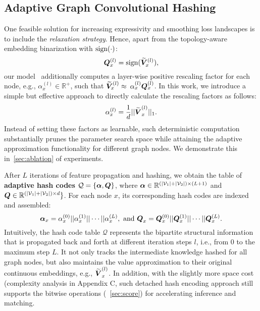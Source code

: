 \subsection{Adaptive Graph Convolutional Hashing}
\label{sec:hashing}
One feasible solution for increasing expressivity and smoothing loss landscapes is to include the \textit{relaxation strategy}.
Hence, apart from the topology-aware embedding binarization with $\operatorname{sign}(\cdot)$:
\begin{equation}
\setlength\abovedisplayskip{2pt}
\setlength\belowdisplayskip{2pt}
\label{eq:hashing}
\emb{Q}_{x}^{(l)} = \sign(\widetilde{\emb{V}}_{x}^{(l)}),
\end{equation}
our model \model~additionally computes a layer-wise positive rescaling factor for each node, e.g., $\alpha_x^{(l)} \in \mathbb{R}^+$, such that $\widetilde{\boldsymbol{V}}^{(l)}_x \approx$ $\alpha_x^{(l)} \boldsymbol{Q}^{(l)}_x$.
In this work, we introduce a simple but effective approach to directly calculate the rescaling factors as follows: 
\begin{equation}
\setlength\abovedisplayskip{2pt}
\setlength\belowdisplayskip{2pt}
\label{eq:rescale}
\alpha_x^{(l)} = \frac{1}{d} ||\widetilde{\emb{{V}}}_x^{(l)}||_1.
\end{equation}
Instead of setting these factors as learnable, such deterministic computation substantially prunes the parameter search space while attaining the adaptive approximation functionality for different graph nodes. 
We demonstrate this in~\cref{sec:ablation} of experiments. 



After $L$ iterations of feature propagation and hashing, we obtain the table of \textbf{adaptive hash codes} $\mathcal{Q} = \{\boldsymbol{\alpha}, \boldsymbol{Q}\}$, where $\boldsymbol{\alpha} \in \mathbb{R}^{(|\mathcal{V}_1|+|\mathcal{V}_2|)\times (L+1)}$ and $\boldsymbol{Q} \in \mathbb{R}^{(|\mathcal{V}_1|+|\mathcal{V}_2|)\times d}\}$.
For each node $x$, its corresponding hash codes are indexed and assembled:
\begin{equation}
\setlength\abovedisplayskip{2pt}
\setlength\belowdisplayskip{2pt}
\emb{\alpha}_x = \alpha_x^{(0)} || \alpha_x^{(1)} || \cdots || \alpha_x^{(L)}, \text{  and  } \emb{{Q}}_x = \emb{Q}_x^{(0)} || \emb{Q}_x^{(1)} || \cdots || \emb{Q}_x^{(L)}.
\end{equation}
Intuitively, the hash code table $\mathcal{Q}$ represents the bipartite structural information that is propagated back and forth at different iteration steps $l$, i.e., from $0$ to the maximum step $L$.
It not only tracks the intermediate knowledge hashed for all graph nodes, but also maintains the value approximation to their original continuous embeddings, e.g., {\footnotesize $\widetilde{\boldsymbol{{V}}}_x^{(l)}$}.
In addition, with the slightly more space cost (complexity analysis in Appendix C, such detached hash encoding approach still supports the bitwise operations (~\cref{sec:score}) for accelerating inference and matching. 



